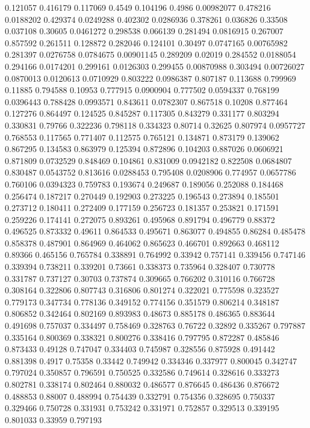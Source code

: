 0.121057 0.416179
0.117069 0.4549
0.104196 0.4986
0.00982077 0.478216
0.0188202 0.429374
0.0249288 0.402302
0.0286936 0.378261
0.036826 0.33508
0.037108 0.30605
0.0461272 0.298538
0.066139 0.281494
0.0816915 0.267007
0.857592 0.261511
0.128872 0.282046
0.124101 0.30497
0.0747165 0.00765982
0.281397 0.0276758
0.0784675 0.00901145
0.289209 0.02019
0.284552 0.0188054
0.294166 0.0174201
0.299161 0.0126303
0.299455 0.00870988
0.303494 0.00726027
0.0870013 0.0120613
0.0710929 0.803222
0.0986387 0.807187
0.113688 0.799969
0.11885 0.794588
0.10953 0.777915
0.0900904 0.777502
0.0594337 0.768199
0.0396443 0.788428
0.0993571 0.843611
0.0782307 0.867518
0.10208 0.877464
0.127276 0.864497
0.124525 0.845287
0.117305 0.843279
0.331177 0.803294
0.330831 0.79766
0.322236 0.798118
0.334323 0.80714
0.32625 0.807974
0.0957727 0.768553
0.117565 0.771407
0.112575 0.765121
0.134871 0.873179
0.139062 0.867295
0.134583 0.863979
0.125394 0.872896
0.104203 0.887026
0.0606921 0.871809
0.0732529 0.848469
0.104861 0.831009
0.0942182 0.822508
0.0684807 0.830487
0.0543752 0.813616
0.0288453 0.795408
0.0208906 0.774957
0.0657786 0.760106
0.0394323 0.759783
0.193674 0.249687
0.189056 0.252088
0.184468 0.256474
0.187217 0.270449
0.192903 0.273225
0.196543 0.273894
0.185501 0.273712
0.180411 0.272409
0.177159 0.256723
0.181357 0.253821
0.171591 0.259226
0.174141 0.272075
0.893261 0.495968
0.891794 0.496779
0.88372 0.496525
0.873332 0.49611
0.864533 0.495671
0.863077 0.494855
0.86284 0.485478
0.858378 0.487901
0.864969 0.464062
0.865623 0.466701
0.892663 0.468112
0.89366 0.465156
0.765784 0.338891
0.764992 0.33942
0.757141 0.339456
0.747146 0.339394
0.738211 0.339201
0.73661 0.338373
0.735964 0.328407
0.730778 0.331787
0.737127 0.30703
0.737874 0.309665
0.766202 0.310116
0.766728 0.308164
0.322806 0.807743
0.316806 0.801274
0.322021 0.775598
0.323527 0.779173
0.347734 0.778136
0.349152 0.774156
0.351579 0.806214
0.348187 0.806852
0.342464 0.802169
0.893983 0.48673
0.885178 0.486365
0.883644 0.491698
0.757037 0.334497
0.758469 0.328763
0.76722 0.32892
0.335267 0.797887
0.335164 0.800369
0.338321 0.800276
0.338416 0.797795
0.872287 0.485846
0.873433 0.49128
0.747047 0.334403
0.745987 0.328556
0.875928 0.491442
0.881398 0.4917
0.75358 0.33442
0.749942 0.334346
0.337977 0.800045
0.342747 0.797024
0.350857 0.796591
0.750525 0.332586
0.749614 0.328616
0.333273 0.802781
0.338174 0.802464
0.880032 0.486577
0.876645 0.486436
0.876672 0.488853
0.88007 0.488994
0.754439 0.332791
0.754356 0.328695
0.750337 0.329466
0.750728 0.331931
0.753242 0.331971
0.752857 0.329513
0.339195 0.801033
0.33959 0.797193
